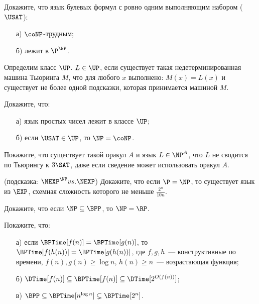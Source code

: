 
\begin{task}
    Докажите, что язык булевых формул с ровно одним выполняющим набором ($\USAT$):
    \begin{enumerate}[topsep = 0pt, itemsep = -1ex]
        \item [а)] $\coNP$-трудным;
        \item [б)] лежит в $\P^{\NP}$.
    \end{enumerate}
\end{task}

Определим класс $\UP$. $L \in \UP$, если существует такая недетерминированная машина
Тьюринга $M$, что для любого $x$ выполнено: $M(x) = L(x)$ и существует не более одной
подсказки, которая принимается машиной $M$.

\begin{task}
    Докажите, что: 
    \begin{enumerate}[topsep = 0pt, itemsep = -1ex]
        \item [а)] язык простых чисел лежит в классе $\UP$;
        \item [б)] если $\USAT \in \UP$, то $\NP = \coNP$.
    \end{enumerate}
\end{task}

\begin{task}
    Покажите, что существует такой оракул $A$ и язык $L \in \NP^A$, что $L$ не
    сводится по Тьюрингу к $3\SAT$, даже если сведение может использовать оракул $A$.
\end{task}

\breakline

\begin{ptask}{26}(подсказка: $\NEXP^{\NP} vs. \NEXP$)
    Докажите, что если $\P = \NP$, то существует язык из $\EXP$, схемная сложность которого не меньше $\frac{2^n}{10 n}$.
\end{ptask}

\begin{ptask}{40}
    Докажите, что если $\NP \subseteq \BPP$, то $\NP = \RP$.
\end{ptask}

\begin{ptask}{44}
    Покажите, что:
	\begin{enumerate}[topsep = 0pt, itemsep = -1ex]
        \item [а)] если $\BPTime[f(n)] = \BPTime[g(n)]$, то $\BPTime[f(h(n))] = \BPTime[g(h(n))]$, где $f, g, h$~---
			конструктивные по времени, $f(n), g(n) \ge \log n$, $h(n) \ge n$~--- возрастающая функция;
        \item [б)] $\DTime[f(n)] \subseteq \BPTime[f(n)] \subseteq \DTime[2^{O(f(n))}]$;
        \item [в)] $\BPP \subseteq \BPTime[n^{\log n}] \subsetneq \BPTime[2^n]$.
    \end{enumerate}
\end{ptask}

